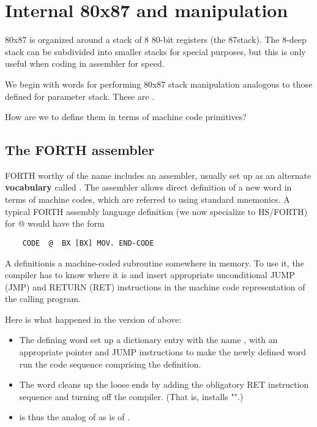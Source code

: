 \section{Internal 80x87 and manipulation}
 80x87 is organized around a stack of 8 80-bit registers (the 87stack). The 8-deep stack can be subdivided into smaller stacks for special purposes, but this is only useful when coding in assembler for speed.

We begin with words for performing 80x87 stack manipulation analogous to those defined for parameter stack. These are .

How are we to define them in terms of machine code primitives?

\subsection{The FORTH assembler}

 FORTH worthy of the name includes an assembler, usually set up as an alternate \textbf{vocabulary} called . The assembler allows direct definition of a new word in terms of machine codes, which are referred to using standard mnemonics. A typical FORTH assembly language definition (we now specialize to HS/FORTH) for @ would have the form

\begin{lstlisting}
    CODE  @  BX [BX] MOV. END-CODE
\end{lstlisting}

A  definitionis a machine-coded subroutine somewhere in memory. To use it, the compiler has to know where it is and insert appropriate unconditional JUMP (JMP) and RETURN (RET) instructions in the machine code representation of the calling program.

Here is what happened in the  version of  above:

\begin{itemize}
    \item The defining word  set up a dictionary entry with the name , with an appropriate pointer and JUMP instructions to make the newly defined word run the code sequence comprising the definition.
    \item The word  cleans up the loose ends by adding the obligatory RET instruction sequence and turning off the compiler. (That is,  installs "".)
    \item {} is thus the analog of \bc{;} as  is of \bc{:}.
\end{itemize}

